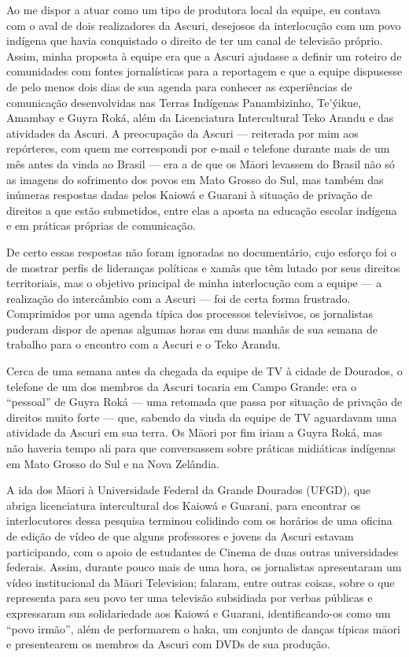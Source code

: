 Ao me dispor a atuar como um tipo de produtora local da equipe, eu
contava com o aval de dois realizadores da Ascuri, desejosos da
interlocução com um povo indígena que havia conquistado o direito de
ter um canal de televisão próprio. Assim, minha proposta à equipe era
que a Ascuri ajudasse a definir um roteiro de comunidades com fontes
jornalísticas para a reportagem e que a equipe dispusesse de pelo menos
dois dias de sua agenda para conhecer as experiências de comunicação
desenvolvidas nas Terras Indígenas Panambizinho, Te’ýikue, Amambay e
Guyra Roká, além da Licenciatura Intercultural Teko Arandu e das
atividades da Ascuri. A preocupação da Ascuri — reiterada por mim aos
repórteres, com quem me correspondi por e-mail e telefone durante mais
de um mês antes da vinda ao Brasil — era a de que os M\=aori levassem
do Brasil não só as imagens do sofrimento dos povos em Mato Grosso do
Sul, mas também das inúmeras respostas dadas pelos Kaiowá e Guarani à
situação de privação de direitos a que estão submetidos, entre elas a
aposta na educação escolar indígena e em práticas próprias de
comunicação. 

De certo essas respostas não foram ignoradas no documentário, cujo
esforço foi o de mostrar perfis de lideranças políticas e xamãs que têm
lutado por seus direitos territoriais, mas o objetivo principal de
minha interlocução com a equipe — a realização do intercâmbio com a
Ascuri — foi de certa forma frustrado. Comprimidos por uma agenda
típica dos processos televisivos, os jornalistas puderam dispor de
apenas algumas horas em duas manhãs de sua semana de trabalho para o
encontro com a Ascuri e o Teko Arandu.

Cerca de uma semana antes da chegada da equipe de TV à cidade de
Dourados, o telefone de um dos membros da Ascuri tocaria em Campo
Grande: era o ``pessoal'' de Guyra Roká — uma retomada que passa por
situação de privação de direitos muito forte — que, sabendo da vinda da
equipe de TV aguardavam uma atividade da Ascuri em sua terra. Os
M\=aori por fim iriam a Guyra Roká, mas não haveria tempo ali para que
conversassem sobre práticas midiáticas indígenas em Mato Grosso do Sul
e na Nova Zelândia. 

A ida dos M\=aori à Universidade Federal da Grande Dourados (UFGD), que
abriga licenciatura intercultural dos Kaiowá e Guarani, para encontrar
os interlocutores dessa pesquisa terminou colidindo com os horários de
uma oficina de edição de vídeo de que alguns professores e jovens da
Ascuri estavam participando, com o apoio de estudantes de Cinema de
duas outras universidades federais. Assim, durante pouco mais de uma
hora, os jornalistas apresentaram um vídeo institucional da M\=aori
Television; falaram, entre outras coisas, sobre o que representa para
seu povo ter uma televisão subsidiada por verbas públicas e expressaram
sua solidariedade aos Kaiowá e Guarani, identificando-os como um ``povo
irmão'', além de performarem o haka, um conjunto de danças típicas
m\=aori e presentearem os membros da Ascuri com DVDs de sua produção. 

